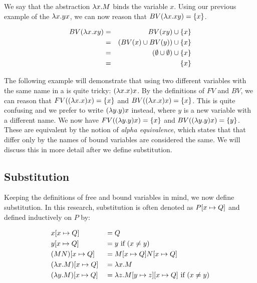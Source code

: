We say that the abstraction $\lambda {x}.{M}$ binds the variable $x$. Using our previous example of the \lterm $\lambda {x}.{yx}$, we can now reason that $BV(\lambda {x}.{xy}) = \{x\}$. 

\begin{eqnarray*}
	BV(\lambda {x}.{xy}) &=& BV(xy) \cup \{x\} \\
	&=& (BV(x) \cup BV(y)) \cup \{x\} \\
	&=& (\emptyset \cup \emptyset) \cup \{x\} \\
	&=& \{x\}
\end{eqnarray*}


The following example will demonstrate that using two different variables with the same name in a \lterm is quite tricky: $(\lambda {x}.{x})x$.
By the definitions of $FV$ and $BV$, we can reason that $FV((\lambda {x}.{x})x) = \{x\}$ and $BV((\lambda {x}.{x})x) = \{x\}$.
This is quite confusing and we prefer to write $(\lambda {y}.{y})x$ instead, where $y$ is a new variable with a different name.
We now have $FV((\lambda {y}.{y})x) = \{x\}$ and $BV((\lambda {y}.{y})x) = \{y\}$.
These \lterms are equivalent by the notion of \emph{alpha equivalence}, which states that \lterms that differ only by the names of bound variables are considered the same.
We will discuss this in more detail after we define substitution.

\subsection{Substitution}
Keeping the definitions of free and bound variables in mind, we now define substitution. 
In this research, substitution is often denoted as $P [{x}\mapsto{Q}]$ and defined inductively on $P$ by:

\[
\begin{aligned}
	& x [{x}\mapsto{Q}]             & &= Q \\
	& y [{x}\mapsto{Q}]             & &= y \text{ if } (x \neq y)\\
	& (M N) [{x}\mapsto{Q}]         & &= M [{x}\mapsto{Q}] N [{x}\mapsto{Q}] \\
	& (\lambda {x}.{M}) [{x}\mapsto{Q}] & &= \lambda {x}.{M} \\
	& (\lambda {y}.{M}) [{x}\mapsto{Q}] & &= \lambda {z}.{M [{y}\mapsto{z}][{x}\mapsto{Q}]} \text{ if } (x \neq y) \\
\end{aligned}
\]


